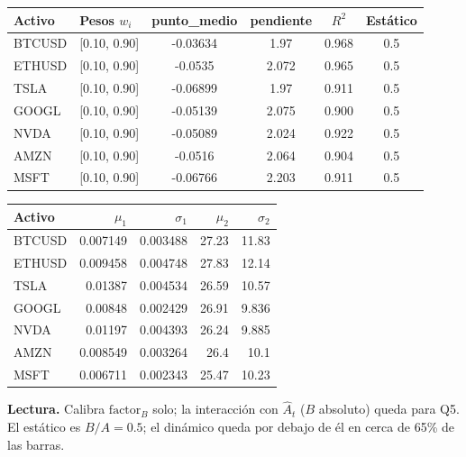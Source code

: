 \documentclass[11pt,a4paper]{article}
\begin{document}
\begin{center}\end{center}
\begin{center}\small\setlength{\tabcolsep}{5pt}
\begin{tabular}{llcccc}\toprule
Activo & Pesos $w_i$ & punto\_medio & pendiente & $R^2$ & Estático \\\midrule
BTCUSD & [0.10, 0.90] & -0.03634 & 1.97 & 0.968 & 0.5 \\
ETHUSD & [0.10, 0.90] & -0.0535 & 2.072 & 0.965 & 0.5 \\
TSLA & [0.10, 0.90] & -0.06899 & 1.97 & 0.911 & 0.5 \\
GOOGL & [0.10, 0.90] & -0.05139 & 2.075 & 0.900 & 0.5 \\
NVDA & [0.10, 0.90] & -0.05089 & 2.024 & 0.922 & 0.5 \\
AMZN & [0.10, 0.90] & -0.0516 & 2.064 & 0.904 & 0.5 \\
MSFT & [0.10, 0.90] & -0.06766 & 2.203 & 0.911 & 0.5 \\
\bottomrule\end{tabular}

\medskip
\begin{tabular}{lrrrr}\toprule
Activo & $\mu_1$ & $\sigma_1$ & $\mu_2$ & $\sigma_2$ \\\midrule
BTCUSD & 0.007149 & 0.003488 & 27.23 & 11.83 \\
ETHUSD & 0.009458 & 0.004748 & 27.83 & 12.14 \\
TSLA & 0.01387 & 0.004534 & 26.59 & 10.57 \\
GOOGL & 0.00848 & 0.002429 & 26.91 & 9.836 \\
NVDA & 0.01197 & 0.004393 & 26.24 & 9.885 \\
AMZN & 0.008549 & 0.003264 & 26.4 & 10.1 \\
MSFT & 0.006711 & 0.002343 & 25.47 & 10.23 \\
\bottomrule\end{tabular}\end{center}
\textbf{Lectura.} Calibra $\text{factor}_B$ solo; la interacción con $\hat A_t$ ($B$ absoluto) queda para Q5. El estático es $B/A=0.5$; el dinámico queda por debajo de él en cerca de 65\% de las barras.
\newpage
\end{document}
